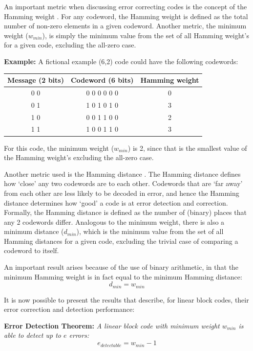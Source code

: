 \documentclass[11pt]{article}
\numberwithin{equation}{subsection}
\begin{document}
An important metric when discussing error correcting codes is the concept of the Hamming weight \cite{coon15}. 
For any codeword, the Hamming weight is defined as the total number of non-zero elements in a given codeword. 
Another metric, the minimum weight ($w_{min}$), is simply the minimum value from the set of all Hamming weight's for a given code, excluding the all-zero case.

\textbf{Example:}
A fictional example (6,2) code could have the following codewords:

\begin{center}
\begin{tabular}{ c | c | c }
Message (2 bits) & Codeword (6 bits) & Hamming weight \\
\hline
0 0 & 0 0 0 0 0 0 & 0 \\
0 1 & 1 0 1 0 1 0 & 3 \\
1 0 & 0 0 1 1 0 0 & 2 \\
1 1 & 1 0 0 1 1 0 & 3 \\
\end{tabular}
\end{center}
For this code, the minimum weight ($w_{min}$) is 2, since that is the smallest value of the Hamming weight's excluding the all-zero case.

Another metric used is the Hamming distance \cite{coon15}. The Hamming distance defines how `close' any two codewords are to each other. Codewords that are `far away' from each other are less likely to be decoded in error, and hence the Hamming distance determines how `good' a code is at error detection and correction. Formally, the Hamming distance is defined as the number of (binary) places that any 2 codewords differ. Analogous to the minimum weight, there is also a minimum distance ($d_{min}$), which is the minimum value from the set of all Hamming distances for a given code, excluding the trivial case of comparing a codeword to itself.

An important result arises because of the use of binary arithmetic, in that the minimum Hamming weight is in fact equal to the minimum Hamming distance:
\begin{equation}
d_{min} = w_{min}
\end{equation}

It is now possible to present the results that describe, for linear block codes, their error correction and detection performance:

\medskip
\noindent
\textbf{Error Detection Theorem:}
\textit{A linear block code with minimum weight $w_{min}$ is able to detect up to $e$ errors:}
\begin{equation}
e_{detectable} = w_{min} - 1
\end{equation}
\end{document}
